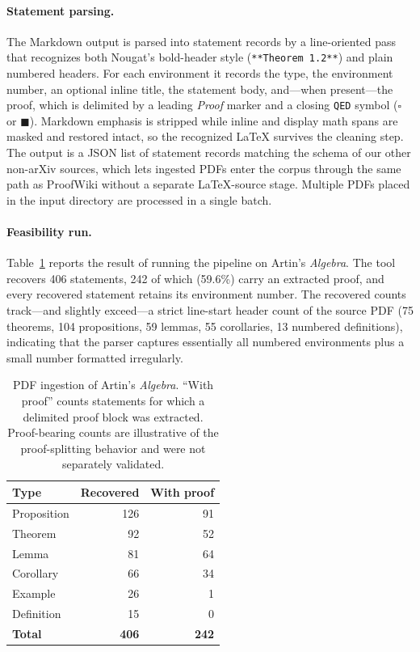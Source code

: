 \paragraph{Statement parsing.}
The Markdown output is parsed into statement records by a line-oriented pass that recognizes both Nougat's bold-header style (\verb|**Theorem 1.2**|) and plain numbered headers. For each environment it records the type, the environment number, an optional inline title, the statement body, and---when present---the proof, which is delimited by a leading \emph{Proof} marker and a closing \texttt{QED} symbol ($\square$ or $\blacksquare$). Markdown emphasis is stripped while inline and display math spans are masked and restored intact, so the recognized \LaTeX{} survives the cleaning step. The output is a JSON list of statement records matching the schema of our other non-arXiv sources, which lets ingested PDFs enter the corpus through the same path as ProofWiki without a separate \LaTeX{}-source stage. Multiple PDFs placed in the input directory are processed in a single batch.

\paragraph{Feasibility run.}
Table~\ref{tab:pdf-artin} reports the result of running the pipeline on Artin's \emph{Algebra}. The tool recovers 406 statements, 242 of which (59.6\%) carry an extracted proof, and every recovered statement retains its environment number. The recovered counts track---and slightly exceed---a strict line-start header count of the source PDF (75 theorems, 104 propositions, 59 lemmas, 55 corollaries, 13 numbered definitions), indicating that the parser captures essentially all numbered environments plus a small number formatted irregularly.

\begin{table}[H]
\centering\small
\setlength{\tabcolsep}{6pt}
\begin{tabular}{lrr}
\toprule
\textbf{Type} & \textbf{Recovered} & \textbf{With proof} \\
\midrule
Proposition & 126 & 91 \\
Theorem     &  92 & 52 \\
Lemma       &  81 & 64 \\
Corollary   &  66 & 34 \\
Example     &  26 &  1 \\
Definition  &  15 &  0 \\
\midrule
\textbf{Total} & \textbf{406} & \textbf{242} \\
\bottomrule
\end{tabular}
\caption{PDF ingestion of Artin's \emph{Algebra}. ``With proof'' counts statements for which a delimited proof block was extracted. Proof-bearing counts are illustrative of the proof-splitting behavior and were not separately validated.}
\label{tab:pdf-artin}
\end{table}

